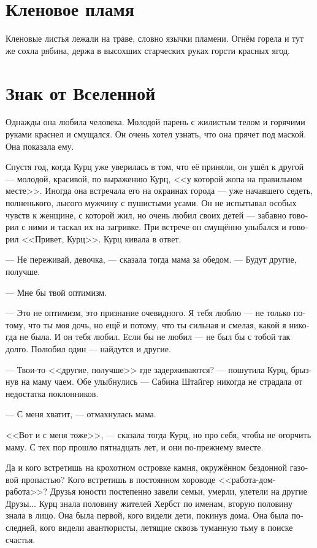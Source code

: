 \documentclass[a4paper,10pt,fleqn]{book}\usepackage{polyglossia}\setdefaultlanguage[babelshorthands=true]{russian}\setotherlanguage{english}\defaultfontfeatures{Ligatures=TeX,Mapping=tex-text}\usepackage{xcolor}\newcommand{\ml}[3]{#2}
\begin{document}
\section{Кленовое пламя}

Кленовые листья лежали на траве, словно язычки пламени.
Огнём горела и тут же сохла рябина, держа в высохших старческих руках горсти красных ягод.

\section{Знак от Вселенной}

Однажды она любила человека.
Молодой парень с жилистым телом и горячими руками краснел и смущался.
Он очень хотел узнать, что она прячет под маской.
Она показала ему.

Спустя год, когда Курц уже уверилась в том, что её приняли, он ушёл к другой --- молодой, красивой, по выражению Курц, <<у которой жопа на правильном месте>>.
Иногда она встречала его на окраинах города --- уже начавшего седеть, полненького, лысого мужчину с пушистыми усами.
Он не испытывал особых чувств к женщине, с которой жил, но очень любил своих детей --- забавно говорил с ними и таскал их на загривке.
При встрече он смущённо улыбался и говорил <<Привет, Курц>>.
Курц кивала в ответ.

--- Не переживай, девочка, --- сказала тогда мама за обедом.
--- Будут другие, получше.

--- Мне бы твой оптимизм.

--- Это не оптимизм, это признание очевидного.
Я тебя люблю --- не только потому, что ты моя дочь, но ещё и потому, что ты сильная и смелая, какой я никогда не была.
И он тебя любил.
Если бы не любил --- не был бы с тобой так долго.
Полюбил один --- найдутся и другие.

--- Твои-то <<другие, получше>> где задерживаются? --- пошутила Курц, брызнув на маму чаем.
Обе улыбнулись --- Сабина Штайгер никогда не страдала от недостатка поклонников.

--- С меня хватит, --- отмахнулась мама.

<<Вот и с меня тоже>>, --- сказала тогда Курц, но про себя, чтобы не огорчить маму.
С тех пор прошло пятнадцать лет, и они по-прежнему вместе.

Да и кого встретишь на крохотном островке камня, окружённом бездонной газовой пропастью?
Кого встретишь в постоянном хороводе <<работа-дом-работа>>?
Друзья юности постепенно завели семьи, умерли, улетели на другие Друзы...
Курц знала половину жителей Хербст по именам, вторую половину знала в лицо.
Она была первой, кого видели дети, покинув дома.
Она была последней, кого видели авантюристы, летящие сквозь туманную тьму в поиске счастья.
\end{document}
